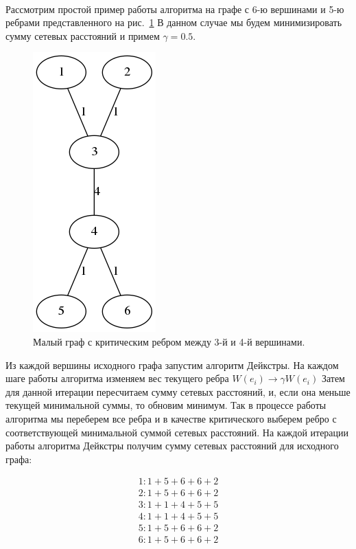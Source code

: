 \documentclass[12pt]{article}
\begin{document}
\paragraph{}

Рассмотрим простой пример работы алгоритма на графе с 6-ю вершинами и 5-ю ребрами
представленного на рис.~\ref{fig:min_graph_4} В данном случае мы будем минимизировать сумму сетевых расстояний и
примем $\gamma = 0.5$.

\begin{figure}[h]
    \centering
    \includegraphics[scale=0.7]{min_graph_4.png}
    \caption{Малый граф с критическим ребром между 3-й и 4-й вершинами.}
    \label{fig:min_graph_4}
\end{figure}

Из каждой вершины исходного графа запустим алгоритм Дейкстры.
На каждом шаге работы алгоритма изменяем вес текущего ребра $W(e_i) \rightarrow \gamma W(e_i)$
Затем для данной итерации пересчитаем сумму сетевых расстояний, и, если она меньше текущей минимальной суммы,
то обновим минимум. Так в процессе работы алгоритма мы переберем все ребра и в качестве критического выберем 
ребро с соответствующей минимальной суммой сетевых расстояний. 
На каждой итерации работы алгоритма Дейкстры получим сумму сетевых расстояний для исходного графа:

\begin{gather}
1 : 1 + 5 + 6 + 6 + 2 \\
2 : 1 + 5 + 6 + 6 + 2 \\
3 : 1 + 1 + 4 + 5 + 5 \\
4 : 1 + 1 + 4 + 5 + 5 \\
5 : 1 + 5 + 6 + 6 + 2 \\
6 : 1 + 5 + 6 + 6 + 2
\end{gather}
\end{document}
